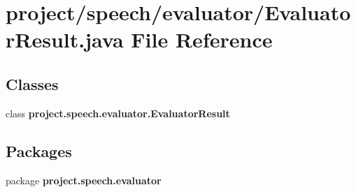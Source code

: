 \section{project/speech/evaluator/\+Evaluator\+Result.java File Reference}
\label{_evaluator_result_8java}
\subsection*{Classes}
\begin{DoxyCompactItemize}
\item 
class {\bf project.\+speech.\+evaluator.\+Evaluator\+Result}
\end{DoxyCompactItemize}
\subsection*{Packages}
\begin{DoxyCompactItemize}
\item 
package {\bf project.\+speech.\+evaluator}
\end{DoxyCompactItemize}
